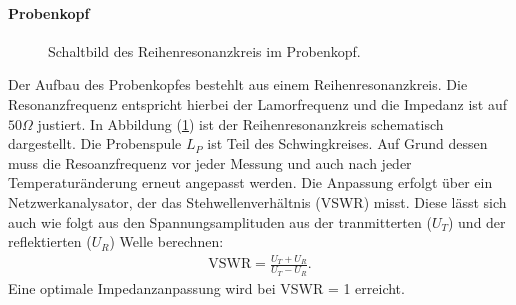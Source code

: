 \paragraph{Probenkopf}
\begin{figure}
	\centering
	\caption{Schaltbild des Reihenresonanzkreis im Probenkopf.}
	\label{probenkopf.}
\end{figure}
Der Aufbau des Probenkopfes bestehlt aus einem Reihenresonanzkreis.
Die Resonanzfrequenz entspricht hierbei der Lamorfrequenz und die Impedanz ist auf $50 \Omega$ justiert.
In Abbildung (\ref{probenkopf.}) ist der Reihenresonanzkreis schematisch dargestellt.
Die Probenspule $L_P$ ist Teil des Schwingkreises.
Auf Grund dessen muss die Resoanzfrequenz vor jeder Messung und auch nach jeder Temperatur\"{a}nderung erneut angepasst werden.
Die Anpassung erfolgt \"{u}ber ein Netzwerkanalysator, der das Stehwellenverhältnis (VSWR) misst.
Diese l\"{a}sst sich auch wie folgt aus den Spannungsamplituden aus der tranmitterten ($U_T$) und der reflektierten ($U_R$) Welle berechnen:
\begin{align*}
	\text{VSWR} = \frac{U_T + U_R}{U_T - U_R} .
\end{align*}
Eine optimale Impedanzanpassung wird bei VSWR = 1 erreicht.

